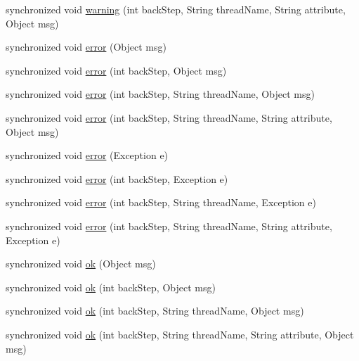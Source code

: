 \begin{DoxyCompactItemize}
\item 
synchronized void \hyperlink{classit_1_1emarolab_1_1cagg_1_1debugging_1_1DebuggingText_1_1Log4j_aff7eb11ae8f4745f325808055f596beb}{warning} (int back\-Step, String thread\-Name, String attribute, Object msg)
\item 
synchronized void \hyperlink{classit_1_1emarolab_1_1cagg_1_1debugging_1_1DebuggingText_1_1Log4j_a50cfb2a9aa91e442d666f5beb412e3eb}{error} (Object msg)
\item 
synchronized void \hyperlink{classit_1_1emarolab_1_1cagg_1_1debugging_1_1DebuggingText_1_1Log4j_a11fb18f5c64e248bf8eefc36a610bed8}{error} (int back\-Step, Object msg)
\item 
synchronized void \hyperlink{classit_1_1emarolab_1_1cagg_1_1debugging_1_1DebuggingText_1_1Log4j_ab1cf9656489f2ff2fe9193e8b9e88fdf}{error} (int back\-Step, String thread\-Name, Object msg)
\item 
synchronized void \hyperlink{classit_1_1emarolab_1_1cagg_1_1debugging_1_1DebuggingText_1_1Log4j_a0cb7a41e75255bbd34e2741b40820e6c}{error} (int back\-Step, String thread\-Name, String attribute, Object msg)
\item 
synchronized void \hyperlink{classit_1_1emarolab_1_1cagg_1_1debugging_1_1DebuggingText_1_1Log4j_af37de65c8c4cbf1a453ee1428fd6379d}{error} (Exception e)
\item 
synchronized void \hyperlink{classit_1_1emarolab_1_1cagg_1_1debugging_1_1DebuggingText_1_1Log4j_a65215ecec28211f42f12c10073968c46}{error} (int back\-Step, Exception e)
\item 
synchronized void \hyperlink{classit_1_1emarolab_1_1cagg_1_1debugging_1_1DebuggingText_1_1Log4j_a8e3d327a1602604eabdea69e2d392fab}{error} (int back\-Step, String thread\-Name, Exception e)
\item 
synchronized void \hyperlink{classit_1_1emarolab_1_1cagg_1_1debugging_1_1DebuggingText_1_1Log4j_a1d60d43baeabd287f4372dbce8f02ee6}{error} (int back\-Step, String thread\-Name, String attribute, Exception e)
\item 
synchronized void \hyperlink{classit_1_1emarolab_1_1cagg_1_1debugging_1_1DebuggingText_1_1Log4j_afcbd78c2ea3791329abf8c0f3c393b93}{ok} (Object msg)
\item 
synchronized void \hyperlink{classit_1_1emarolab_1_1cagg_1_1debugging_1_1DebuggingText_1_1Log4j_a8a57fe0e99106a494261bfba22bb8bd5}{ok} (int back\-Step, Object msg)
\item 
synchronized void \hyperlink{classit_1_1emarolab_1_1cagg_1_1debugging_1_1DebuggingText_1_1Log4j_a8c86faf53c4d70fba59603191758d3c0}{ok} (int back\-Step, String thread\-Name, Object msg)
\item 
synchronized void \hyperlink{classit_1_1emarolab_1_1cagg_1_1debugging_1_1DebuggingText_1_1Log4j_abb4554bed71b85683079e15840c3e7c5}{ok} (int back\-Step, String thread\-Name, String attribute, Object msg)
\end{DoxyCompactItemize}
